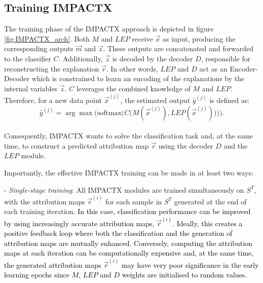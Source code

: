 %


\subsection{Training IMPACTX}
\label{sec:training}
The training phase of the IMPACTX approach is depicted in figure \ref{fig:IMPACTX_arch}.
Both $M$ and $LEP$ receive $\vec{x}$ as input, producing the corresponding outputs $\vec{m}$ and $\vec{z}$. These outputs are concatenated and forwarded to the classifier $C$. Additionally, $\vec{z}$ is decoded by the decoder $D$, responsible for reconstructing the explanation $\vec{r}$. In other words, $LEP$ and $D$ act as an Encoder-Decoder which is constrained to learn an encoding of the explanations by the internal variables $\vec{z}$. $C$ leverages the combined knowledge of $M$  and $LEP$. Therefore, for a new data point $\vec{x}^{(j)}$, the  estimated output $\hat{y}^{(j)}$ is defined as: $$\hat{y}^{(j)} = \arg\max\bigg( \text{softmax} \Big(C\big(M(\vec{x}^{(j)}), LEP(\vec{x}^{(j)})\big)\Big)\bigg).$$ %
\\Consequently, IMPACTX wants to solve the classification task and, at the same time, to construct a predicted attribution map $\vec{r}$ using the decoder $D$ and the $LEP$ module. 

Importantly, the effective IMPACTX training can be made in at least two ways:

- \textit{Single-stage training}: All IMPACTX modules are trained simultaneously on $S^T$, with the attribution maps $\vec{r}^{(i)}$ for each sample in $S^T$ generated at the end of each training iteration. \textcolor{black}{In this case, classification performance can be improved by using increasingly accurate attribution maps, $\vec{r}^{(i)}$. Ideally, this creates a positive feedback loop where both the classification and the generation of attribution maps are mutually enhanced. Conversely, computing the attribution maps at each iteration can be computationally expensive and, at the same time, the generated attribution maps $\vec{r}^{(i)}$ may have very poor significance in the early learning epochs since $M$, $LEP$ and $D$ weights are initialised to random values. %
}

